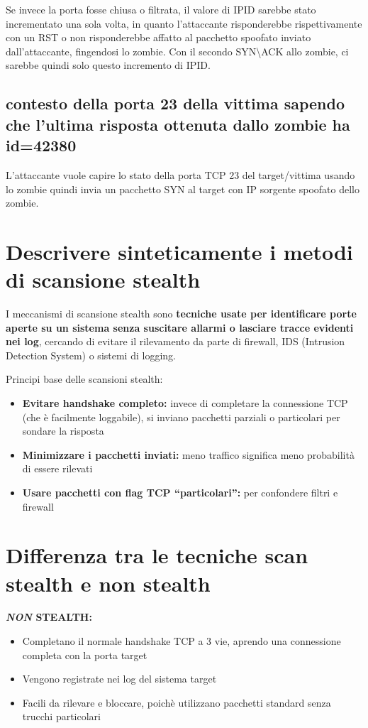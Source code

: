 \documentclass{report}
\begin{document}
\noindent Se invece la porta fosse chiusa o filtrata, il valore di IPID sarebbe stato incrementato una sola volta, in quanto l'attaccante risponderebbe rispettivamente con un RST o non risponderebbe affatto al pacchetto 
spoofato inviato dall'attaccante, fingendosi lo zombie. 
Con il secondo SYN\textbackslash ACK allo zombie, ci sarebbe quindi solo questo incremento di IPID.

\subsection{contesto della porta 23 della vittima sapendo che l'ultima risposta ottenuta dallo zombie ha id=42380}
L'attaccante vuole capire lo stato della porta TCP 23 del target/vittima usando lo zombie
quindi invia un pacchetto SYN al target con IP sorgente spoofato dello zombie.

\section{ Descrivere sinteticamente i metodi di scansione stealth}
\noindent I meccanismi di scansione stealth sono \textbf{tecniche usate per identificare porte aperte su un sistema senza suscitare allarmi o lasciare tracce evidenti nei log}, cercando di evitare il rilevamento da parte di firewall, IDS (Intrusion Detection System) o sistemi di logging.

\noindent Principi base delle scansioni stealth:
\begin{itemize}
    \item \textbf{Evitare handshake completo:} invece di completare la connessione TCP (che è facilmente loggabile), si inviano pacchetti parziali o particolari per sondare la risposta
    \item \textbf{Minimizzare i pacchetti inviati:} meno traffico significa meno probabilità di essere rilevati
    \item \textbf{Usare pacchetti con flag TCP “particolari”:} per confondere filtri e firewall
\end{itemize}

\section{Differenza tra le tecniche scan stealth e non stealth}
\noindent \textbf{\textit{NON} STEALTH:}
\begin{itemize}
    \item Completano il normale handshake TCP a 3 vie, aprendo una connessione completa con la porta target
    \item Vengono registrate nei log del sistema target 
    \item Facili da rilevare e bloccare, poichè utilizzano pacchetti standard senza trucchi particolari
\end{itemize}
\end{document}
